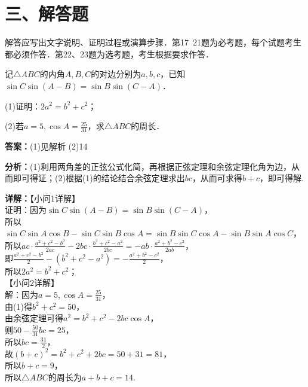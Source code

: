 \section*{三、解答题}
解答应写出文字说明、证明过程或演算步骤．第17~21题为必考题，每个试题考生都必须作答．第22、23题为选考题，考生根据要求作答．

\begin{question}[points=12]
记$\triangle ABC$的内角$A,B,C$的对边分别为$a,b,c$，已知$\sin C\sin(A-B) = \sin B\sin(C-A)$．

(1)证明：$2a^2 = b^2 + c^2$；

(2)若$a=5,\cos A = \frac{25}{31}$，求$\triangle ABC$的周长．
\begin{solution}
\textbf{答案：}(1)见解析 (2)14

\textbf{分析：}(1)利用两角差的正弦公式化简，再根据正弦定理和余弦定理化角为边，从而即可得证；(2)根据(1)的结论结合余弦定理求出$bc$，从而可求得$b+c$，即可得解.

\textbf{详解：}【小问1详解】\\证明：因为$\sin C\sin(A-B)=\sin B\sin(C-A)$，\\所以$\sin C\sin A\cos B - \sin C\sin B\cos A = \sin B\sin C\cos A - \sin B\sin A\cos C$，\\所以$ac\cdot\frac{a^2+c^2-b^2}{2ac} - 2bc\cdot\frac{b^2+c^2-a^2}{2bc} = -ab\cdot\frac{a^2+b^2-c^2}{2ab}$，\\即$\frac{a^2+c^2-b^2}{2} - (b^2+c^2-a^2) = -\frac{a^2+b^2-c^2}{2}$，\\所以$2a^2 = b^2 + c^2$；\\【小问2详解】\\解：因为$a=5,\cos A=\frac{25}{31}$，\\由(1)得$b^2+c^2=50$，\\由余弦定理可得$a^2 = b^2+c^2 - 2bc\cos A$，\\则$50 - \frac{50}{31}bc = 25$，\\所以$bc = \frac{31}{2}$，\\故$(b+c)^2 = b^2+c^2+2bc = 50+31=81$，\\所以$b+c=9$，\\所以$\triangle ABC$的周长为$a+b+c=14$.
\end{solution}
\end{question}

